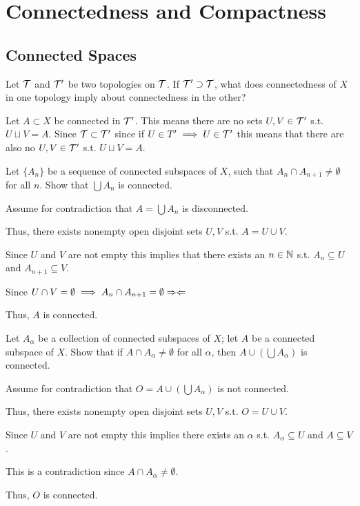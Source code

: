 \section{Connectedness and Compactness}
\subsection{Connected Spaces}
\begin{pb}{}
    Let $\mathcal{T}$ and $\mathcal{T}'$ be two topologies on $\mathcal{T}$. 
    If $\mathcal{T}' \supset \mathcal{T}$, what does connectedness of $X$ in one topology imply about connectedness in the other?
\end{pb}
\begin{problemproof}
    Let $A \subset X$ be connected in $\mathcal{T}'$. This means there are no sets $U,V \in \mathcal{T}'$ s.t. $U \sqcup V=A$. Since $\mathcal{T} \subset \mathcal{T}'$ since if $U \in T' \implies U \in\mathcal{T}'$ this means that there are also no $U,V \in \mathcal{T}'$ s.t. $U \sqcup V =A$.
\end{problemproof}
\vspace{1in}
\begin{pb}{}
    Let $\{A_n\}$ be a sequence of connected subspaces of $X$, such that $A_n\cap A_{n+1} \neq \emptyset$ for all $n$.
    Show that $\bigcup A_n$ is connected.
\end{pb}
\begin{problemproof}
    Assume for contradiction that $A=\displaystyle\bigcup A_n$ is disconnected.

    Thus, there exists nonempty open disjoint sets $U,V$ s.t. $A=U \cup V$.
    
    Since $U$ and $V$ are not empty this implies that there exists an $n \in \mathbb{N}$ s.t. $A_n \subseteq U$ and $A_{n+1} \subseteq V$.

    Since $U \cap V =\emptyset \implies A_n \cap A_{n+1} = \emptyset \Rightarrow \Leftarrow$

    Thus, $A$ is connected.
\end{problemproof}
\vspace{1in}
\begin{pb}{}
    Let ${A_\alpha}$ be a collection of connected subspaces of $X$; let $A$ be a connected subspace of $X$. 
    Show that if $A \cap A_\alpha \neq \emptyset$ for all $\alpha$, then $A \cup ( \bigcup A_\alpha)$ is connected.
\end{pb}
\begin{problemproof}
    Assume for contradiction that $O=A \cup ( \bigcup A_\alpha)$ is not connected.

    Thus, there exists nonempty open disjoint sets $U,V$ s.t. $O=U \cup V$.

    Since $U$ and $V$ are not empty this implies there exists an $\alpha$ s.t. $A_\alpha \subseteq U$ and $A \subseteq V$.

    This is a contradiction since $A \cap A_\alpha \neq \emptyset$.

    Thus, $O$ is connected.
\end{problemproof}
